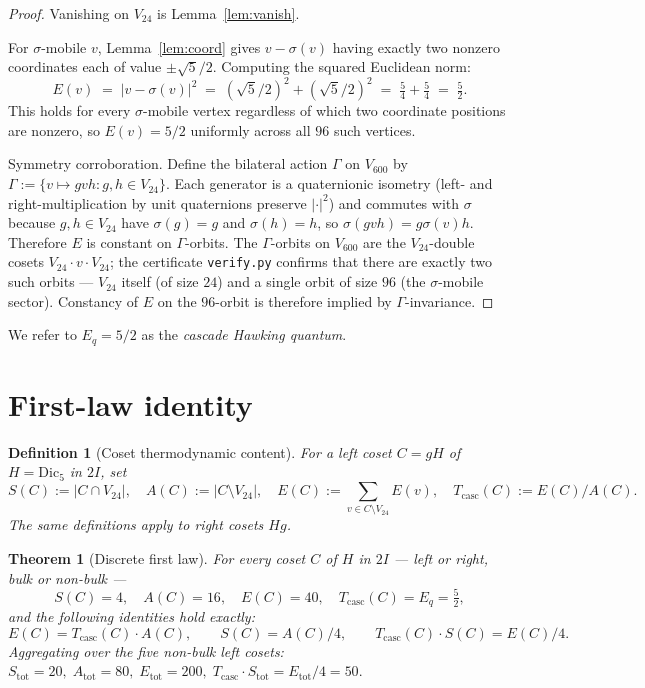 \documentclass[11pt]{article}
\newtheorem{theorem}{Theorem}[section]
\newtheorem{definition}{Definition}[section]
\newcommand{\twoI}{2I}
\newcommand{\Vsixhundred}{V_{600}}
\newcommand{\Dicfive}{\mathrm{Dic}_5}
\newcommand{\Vtwentyfour}{V_{24}}
\newcommand{\sigmaG}{\sigma}
\newcommand{\Eq}{E_q}
\newcommand{\Tcasc}{T_{\mathrm{casc}}}
\begin{document}
\begin{proof}
Vanishing on $\Vtwentyfour$ is Lemma~\ref{lem:vanish}.

For $\sigmaG$-mobile $v$, Lemma~\ref{lem:coord} gives $v - \sigmaG(v)$
having exactly two nonzero coordinates each of value $\pm \sqrt{5}/2$.
Computing the squared Euclidean norm:
\[
  E(v) \;=\; |v - \sigmaG(v)|^2 \;=\; (\sqrt{5}/2)^2 + (\sqrt{5}/2)^2
  \;=\; \tfrac{5}{4} + \tfrac{5}{4} \;=\; \tfrac{5}{2}.
\]
This holds for every $\sigmaG$-mobile vertex regardless of which two
coordinate positions are nonzero, so $E(v) = 5/2$ uniformly across all
$96$ such vertices.

Symmetry corroboration. Define the bilateral action $\Gamma$ on
$\Vsixhundred$ by $\Gamma := \{ v \mapsto g v h : g, h \in \Vtwentyfour \}$.
Each generator is a quaternionic isometry (left- and right-multiplication
by unit quaternions preserve $|\cdot|^2$) and commutes with $\sigmaG$
because $g, h \in \Vtwentyfour$ have $\sigmaG(g) = g$ and $\sigmaG(h) = h$,
so $\sigmaG(g v h) = g \sigmaG(v) h$. Therefore $E$ is constant on
$\Gamma$-orbits. The $\Gamma$-orbits on $\Vsixhundred$ are the
$\Vtwentyfour$-double cosets $\Vtwentyfour \cdot v \cdot \Vtwentyfour$;
the certificate \texttt{verify.py} confirms that there are exactly two
such orbits — $\Vtwentyfour$ itself (of size $24$) and a single orbit of
size $96$ (the $\sigmaG$-mobile sector). Constancy of $E$ on the
$96$-orbit is therefore implied by $\Gamma$-invariance.
\end{proof}

We refer to $\Eq = 5/2$ as the \emph{cascade Hawking quantum}.

\section{First-law identity}\label{sec:firstlaw}

\begin{definition}[Coset thermodynamic content]\label{def:coset_thermo}
For a left coset $C = gH$ of $H = \Dicfive$ in $\twoI$, set
\[
  S(C) := |C \cap \Vtwentyfour|, \quad
  A(C) := |C \setminus \Vtwentyfour|, \quad
  E(C) := \!\sum_{v \in C \setminus \Vtwentyfour}\! E(v),
  \quad \Tcasc(C) := E(C) / A(C).
\]
The same definitions apply to right cosets $Hg$.
\end{definition}

\begin{theorem}[Discrete first law]\label{thm:firstlaw}
For every coset $C$ of $H$ in $\twoI$ — left or right, bulk or
non-bulk —
\[
  S(C) = 4, \quad A(C) = 16, \quad E(C) = 40, \quad
  \Tcasc(C) = \Eq = \tfrac{5}{2},
\]
and the following identities hold exactly:
\[
  E(C) = \Tcasc(C) \cdot A(C), \qquad
  S(C) = A(C) / 4, \qquad
  \Tcasc(C) \cdot S(C) = E(C) / 4.
\]
Aggregating over the five non-bulk left cosets:
\(
  S_{\mathrm{tot}} = 20,\; A_{\mathrm{tot}} = 80,\;
  E_{\mathrm{tot}} = 200,\;
  \Tcasc \cdot S_{\mathrm{tot}} = E_{\mathrm{tot}} / 4 = 50.
\)
\end{theorem}
\end{document}
